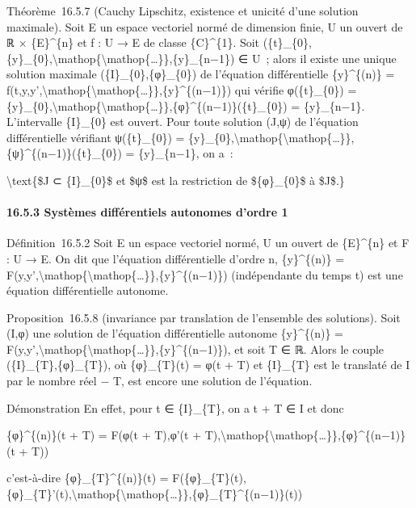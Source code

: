 \documentclass[]{article}
\begin{document}
Théorème~16.5.7 (Cauchy Lipschitz, existence et unicité d'une solution
maximale). Soit E un espace vectoriel normé de dimension finie, U un
ouvert de ℝ × \{E\}\^{}\{n\} et f : U → E de classe \{C\}\^{}\{1\}. Soit
(\{t\}\_\{0\},\{y\}\_\{0\},\textbackslash{}mathop\{\textbackslash{}mathop\{\ldots{}\}\},\{y\}\_\{n−1\})
∈ U~; alors il existe une unique solution maximale
(\{I\}\_\{0\},\{φ\}\_\{0\}) de l'équation différentielle
\{y\}\^{}\{(n)\} =
f(t,y,y',\textbackslash{}mathop\{\textbackslash{}mathop\{\ldots{}\}\},\{y\}\^{}\{(n−1)\})
qui vérifie φ(\{t\}\_\{0\}) =
\{y\}\_\{0\},\textbackslash{}mathop\{\textbackslash{}mathop\{\ldots{}\}\},\{φ\}\^{}\{(n−1)\}(\{t\}\_\{0\})
= \{y\}\_\{n−1\}. L'intervalle \{I\}\_\{0\} est ouvert. Pour toute
solution (J,ψ) de l'équation différentielle vérifiant ψ(\{t\}\_\{0\}) =
\{y\}\_\{0\},\textbackslash{}mathop\{\textbackslash{}mathop\{\ldots{}\}\},\{ψ\}\^{}\{(n−1)\}(\{t\}\_\{0\})
= \{y\}\_\{n−1\}, on a~:

\textbackslash{}text\{\$J ⊂ \{I\}\_\{0\}\$ et \$ψ\$ est la restriction
de \$\{φ\}\_\{0\}\$ à \$J\$.\}

\paragraph{16.5.3 Systèmes différentiels autonomes d'ordre 1}

Définition~16.5.2 Soit E un espace vectoriel normé, U un ouvert de
\{E\}\^{}\{n\} et F : U → E. On dit que l'équation différentielle
d'ordre n, \{y\}\^{}\{(n)\} =
F(y,y',\textbackslash{}mathop\{\textbackslash{}mathop\{\ldots{}\}\},\{y\}\^{}\{(n−1)\})
(indépendante du temps t) est une équation différentielle autonome.

Proposition~16.5.8 (invariance par translation de l'ensemble des
solutions). Soit (I,φ) une solution de l'équation différentielle
autonome \{y\}\^{}\{(n)\} =
F(y,y',\textbackslash{}mathop\{\textbackslash{}mathop\{\ldots{}\}\},\{y\}\^{}\{(n−1)\}),
et soit T ∈ ℝ. Alors le couple (\{I\}\_\{T\},\{φ\}\_\{T\}), où
\{φ\}\_\{T\}(t) = φ(t + T) et \{I\}\_\{T\} est le translaté de I par le
nombre réel − T, est encore une solution de l'équation.

Démonstration En effet, pour t ∈ \{I\}\_\{T\}, on a t + T ∈ I et donc

\{φ\}\^{}\{(n)\}(t + T) = F(φ(t + T),φ'(t +
T),\textbackslash{}mathop\{\textbackslash{}mathop\{\ldots{}\}\},\{φ\}\^{}\{(n−1)\}(t
+ T))

c'est-à-dire \{φ\}\_\{T\}\^{}\{(n)\}(t) =
F(\{φ\}\_\{T\}(t),\{φ\}\_\{T\}'(t),\textbackslash{}mathop\{\textbackslash{}mathop\{\ldots{}\}\},\{φ\}\_\{T\}\^{}\{(n−1)\}(t))
\end{document}
